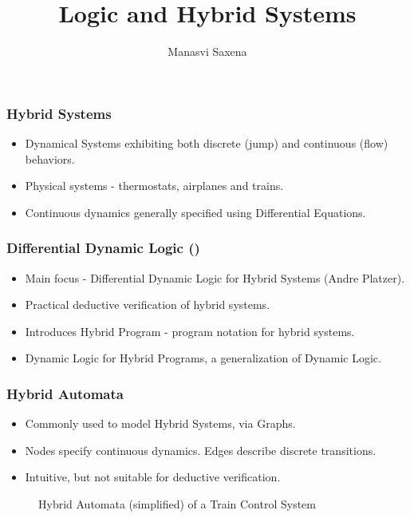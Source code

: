 \documentclass{beamer}
\title{Logic and Hybrid Systems}
\author{Manasvi Saxena}
\institute{Formal Systems Lab, UIUC}
\date{}
\newcommand{\dL}{\text{\upshape\textsf{d{\kern-0.05em}L}}}
\begin{document}
\frame{\titlepage}

\begin{frame}
\frametitle{Hybrid Systems}

\begin{itemize}
  \item Dynamical Systems exhibiting both discrete (jump) and continuous (flow) behaviors.
  \item Physical systems - thermostats, airplanes and trains.
  \item Continuous dynamics generally specified using Differential Equations.
\end{itemize}

\end{frame}

\begin{frame}
  \frametitle{Differential Dynamic Logic (\dL)}
  \begin{itemize}
    \item Main focus - Differential Dynamic Logic for Hybrid Systems (Andre
      Platzer).
      \pause
    \item Practical deductive verification of hybrid systems.
    \item Introduces Hybrid Program - program notation for hybrid systems.
    \item Dynamic Logic for Hybrid Programs, a generalization of Dynamic Logic.
  \end{itemize}

\end{frame}

\begin{frame}
\frametitle{Hybrid Automata}
\begin{itemize}
  \item Commonly used to model Hybrid Systems, via Graphs.
  \item Nodes specify continuous dynamics. Edges describe discrete transitions.
  \item Intuitive, but not suitable for deductive verification.
\end{itemize}
    \pause
\begin{figure}\label{fig:train-HA}
  \centering
  \begin{tikzpicture}[shorten >=1pt,node distance=5cm,on grid,auto]
    
  \end{tikzpicture}
  \caption{Hybrid Automata (simplified) of a Train Control System}
\end{figure}
\end{frame}
\end{document}
